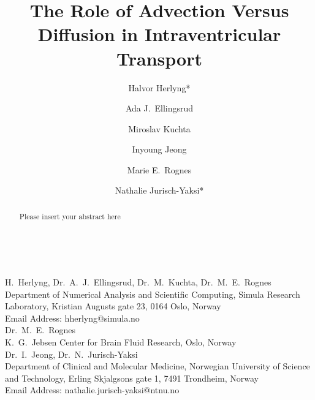 \documentclass{WileyMSP-template}
\begin{document}
\pagestyle{fancy}

\title{The Role of Advection Versus Diffusion in Intraventricular Transport}

\maketitle


\author{Halvor Herlyng*}
\author{Ada J.~Ellingsrud}
\author{Miroslav Kuchta}
\author{Inyoung Jeong}
\author{Marie E.~Rognes} \\
\author{Nathalie Jurisch-Yaksi*}

\begin{affiliations}
H.~Herlyng, Dr.~A.~J.~Ellingsrud, Dr.~M.~Kuchta, Dr.~M.~E.~Rognes\\
Department of Numerical Analysis and Scientific Computing,
Simula Research Laboratory, Kristian Augusts gate 23, 0164 Oslo, Norway\\
Email Address: hherlyng@simula.no
\\
Dr.~M.~E.~Rognes\\
K.~G.~Jebsen Center for Brain Fluid Research, Oslo, Norway
\\
Dr.~I.~Jeong, Dr.~N.~Jurisch-Yaksi\\
Department of Clinical and Molecular Medicine,
Norwegian University of Science and Technology, Erling Skjalgsons gate 1, 7491 Trondheim, Norway \\
Email Address: nathalie.jurisch-yaksi@ntnu.no

\end{affiliations}





\begin{abstract}

Please insert your abstract here

\end{abstract}
\end{document}
